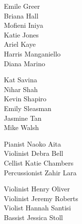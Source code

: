 \documentclass{article}[10pt]
\begin{document}
\begin{center}
\begin{multicols}{3}
\begin{center}
\begin{small}
{Emile Greer}\\
{Briana Hall}\\
{Mofieni Iniya}\\
{Katie Jones}\\
{Ariel Kaye}\\
{Harris Manganiello}\\
{Diana Marino}\null
\columnbreak

{Kat Savina}\\
{Nihar Shah}\\
{Kevin Shapiro}\\
{Emily Sleasman}\\
{Jasmine Tan}\\
{Mike Walsh}
                \end{small}
            \end{center}
        \end{multicols}

        \begin{center}
            \begin{minipage}{3.5in}
                \vspace{-0.1in}
                \begin{multicols}{2}
                    \begin{center}
                        \begin{small}
                            {Pianist Naoko Aita}\\
{Violinist Debra Bell}\\
{Cellist Katie Chambers}\\
{Percussionist Zahir Lara}\null
\columnbreak

{Violinist Henry Oliver}\\
{Violinist Jeremy Roberts}\\
{Violist Hannah Santisi}\\
{Bassist Jessica Stoll}
                        \end{small}
                    \end{center}
                \end{multicols}
            \end{minipage}
        \end{center}

    \end{center}
    \vfill

    \pagebreak

\end{document}
